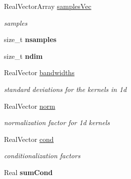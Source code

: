 \begin{DoxyCompactItemize}
\item 
Real\+Vector\+Array \hyperlink{classPecos_1_1GaussianKDE_a754976b55aff35a5cfd425a357b7cff8}{samples\+Vec}\label{classPecos_1_1GaussianKDE_a754976b55aff35a5cfd425a357b7cff8}

\begin{DoxyCompactList}\small\item\em samples \end{DoxyCompactList}\item 
size\+\_\+t {\bfseries nsamples}\label{classPecos_1_1GaussianKDE_a606ae00fa0b8a27e73f62403411f5162}

\item 
size\+\_\+t {\bfseries ndim}\label{classPecos_1_1GaussianKDE_a7cff664dfb347e3967c24b7c4ebe0fa9}

\item 
Real\+Vector \hyperlink{classPecos_1_1GaussianKDE_ae303fb49034fb553ad86c64be017915f}{bandwidths}\label{classPecos_1_1GaussianKDE_ae303fb49034fb553ad86c64be017915f}

\begin{DoxyCompactList}\small\item\em standard deviations for the kernels in 1d \end{DoxyCompactList}\item 
Real\+Vector \hyperlink{classPecos_1_1GaussianKDE_a7bb1668e0ba69304c3aba2e0aa26f6ad}{norm}\label{classPecos_1_1GaussianKDE_a7bb1668e0ba69304c3aba2e0aa26f6ad}

\begin{DoxyCompactList}\small\item\em normalization factor for 1d kernels \end{DoxyCompactList}\item 
Real\+Vector \hyperlink{classPecos_1_1GaussianKDE_acbd955dd6b64ad6b463d823e3f97d2ae}{cond}\label{classPecos_1_1GaussianKDE_acbd955dd6b64ad6b463d823e3f97d2ae}

\begin{DoxyCompactList}\small\item\em conditionalization factors \end{DoxyCompactList}\item 
Real {\bfseries sum\+Cond}\label{classPecos_1_1GaussianKDE_a83d2e9f1cad4454f0605fcbb57099ff5}

\end{DoxyCompactItemize}
